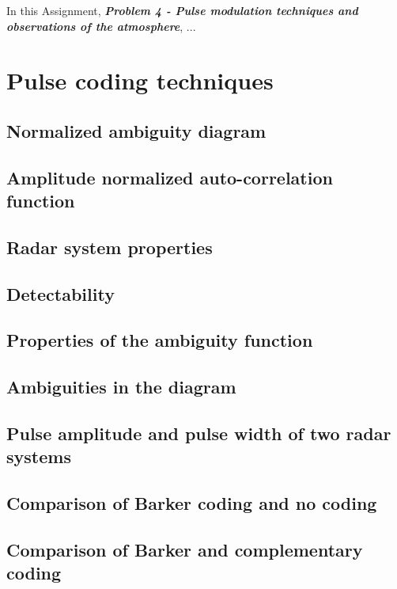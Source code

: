 

In this Assignment, \textit{\textbf{Problem 4 - Pulse modulation techniques and observations of the atmosphere}}, ...


\section{Pulse coding techniques}

\subsection{Normalized ambiguity diagram}

\subsection{Amplitude normalized auto-correlation function}

\subsection{Radar system properties}

\subsection{Detectability}

\subsection{Properties of the ambiguity function}

\subsection{Ambiguities in the diagram}

\subsection{Pulse amplitude and pulse width of two radar systems}

\subsection{Comparison of Barker coding and no coding}

\subsection{Comparison of Barker and complementary coding}

